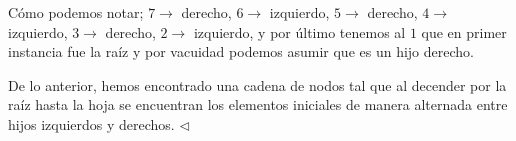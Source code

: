 Cómo podemos notar; $7 \rightarrow$ derecho, $6 \rightarrow$ izquierdo, $5 \rightarrow$ derecho,
$4 \rightarrow$ izquierdo, $3 \rightarrow$ derecho, $2 \rightarrow$ izquierdo, y por último tenemos
al $1$ que en primer instancia fue la raíz y por vacuidad podemos asumir que es un hijo derecho.\newline

De lo anterior, hemos encontrado una cadena de nodos tal que al decender por la raíz hasta la hoja se encuentran
los elementos iniciales de manera alternada entre hijos izquierdos y derechos.
\hfill $\lhd$


